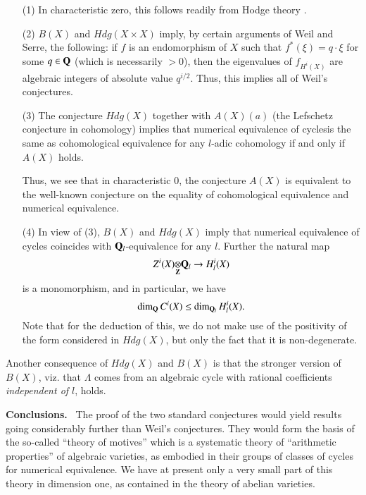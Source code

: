 \begin{remarks*}
\begin{itemize}
\item[(1)] In characteristic zero, this follows readily from Hodge theory \cite{art09-key5}.

\item[(2)] $B(X)$ and $Hdg(X\times X)$ imply, by certain arguments of Weil and Serre, the following: if $f$ is an endomorphism of $X$ such that $f^{*}(\xi)=q\cdot \xi$ for some $q\in \mathbf{Q}$ (which is necessarily $>0$), then the eigenvalues of $f_{H^{i}(X)}$ are algebraic integers of absolute value $q^{i/2}$. Thus, this implies all of Weil's conjectures.

\item[(3)] The conjecture $Hdg(X)$ together with $A(X)(a)$ (the Lefschetz conjecture in cohomology) implies that numerical equivalence of cycles\pageoriginale is the same as cohomological equivalence for any $l$-adic cohomology if and only if $A(X)$ holds.

Thus, we see that in characteristic $0$, the conjecture $A(X)$ is equivalent to the well-known conjecture on the equality of cohomological equivalence and numerical equivalence.

\item[(4)] In view of (3), $B(X)$ and $Hdg(X)$ imply that numerical equivalence of cycles coincides with $\mathbf{Q}_{l}$-equivalence for any $l$. Further the natural map
$$
\foprod{Z^{i}(X)}{\bfQ_{l}}{\bfZ}\to H^{i}_{l}(X)
$$
is a monomorphism, and in particular, we have
$$
\dim_{\mathbf{Q}}C^{i}(X)\leq \dim_{\mathbf{Q}_{l}}H^{i}_{l}(X).
$$
Note that for the deduction of this, we do not make use of the positivity of the form considered in $Hdg(X)$, but only the fact that it is non-degenerate.
\end{itemize}

Another consequence of $Hdg(X)$ and $B(X)$ is that the stronger version of $B(X)$, viz. that $\Lambda$ comes from an algebraic cycle with rational coefficients {\em independent of $l$}, holds.
\end{remarks*}

\noindent
{\bf Conclusions.}~ The proof of the two standard conjectures would yield results going considerably further than Weil's conjectures. They would form the basis of the so-called ``theory of motives'' which is a systematic theory of ``arithmetic properties'' of algebraic varieties, as embodied in their groups of classes of cycles for numerical equivalence. We have at present only a very small part of this theory in dimension one, as contained in the theory of abelian varieties.

